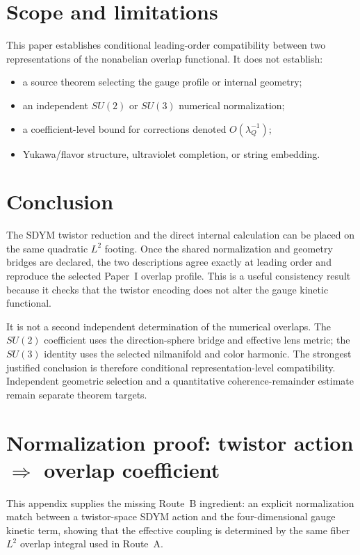 \documentclass[11pt]{article}
\begin{document}
\section{Scope and limitations}

This paper establishes conditional leading-order compatibility between two
representations of the nonabelian overlap functional. It does not establish:
\begin{itemize}
\item a source theorem selecting the gauge profile or internal geometry;
\item an independent $SU(2)$ or $SU(3)$ numerical normalization;
\item a coefficient-level bound for corrections denoted
$O(\lambda_Q^{-1})$;
\item Yukawa/flavor structure, ultraviolet completion, or string embedding.
\end{itemize}

\section{Conclusion}

The SDYM twistor reduction and the direct internal calculation can be placed
on the same quadratic $L^2$ footing. Once the shared normalization and geometry
bridges are declared, the two descriptions agree exactly at leading order and
reproduce the selected Paper~I overlap profile. This is a useful consistency
result because it checks that the twistor encoding does not alter the gauge
kinetic functional.

It is not a second independent determination of the numerical overlaps.
The $SU(2)$ coefficient uses the direction-sphere bridge and effective lens
metric; the $SU(3)$ identity uses the selected nilmanifold and color harmonic.
The strongest justified conclusion is therefore conditional
representation-level compatibility. Independent geometric selection and a
quantitative coherence-remainder estimate remain separate theorem targets.

\appendix
\section{Normalization proof: twistor action $\Rightarrow$ overlap coefficient}

This appendix supplies the missing Route~B ingredient: an explicit normalization
match between a twistor-space SDYM action and the four-dimensional gauge kinetic term,
showing that the effective coupling is determined by the same fiber $L^2$ overlap integral
used in Route~A.
\end{document}
